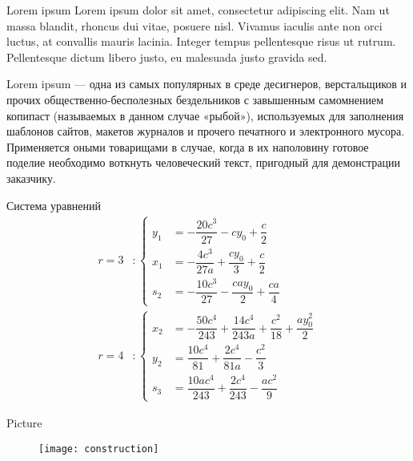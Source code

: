 \documentclass[hyperref={pdftex,unicode}]{beamer}
\begin{document}
\begin{frame}
  \maketitle
\end{frame}

\begin{frame}{Lorem ipsum}
  Lorem ipsum dolor sit amet, consectetur adipiscing elit. Nam ut massa
  blandit, rhoncus dui vitae, posuere nisl. Vivamus iaculis ante non
  orci luctus, at convallis mauris lacinia. Integer tempus pellentesque
  risus ut rutrum. Pellentesque dictum libero justo, eu malesuada justo
  gravida sed. 

  Lorem ipsum — одна из самых популярных в среде десигнеров,
  верстальщиков и прочих общественно-бесполезных бездельников с
  завышенным самомнением копипаст (называемых в данном случае «рыбой»),
  используемых для заполнения шаблонов сайтов, макетов журналов и
  прочего печатного и электронного мусора. Применяется оными товарищами
  в случае, когда в их наполовину готовое поделие необходимо воткнуть
  человеческий текст, пригодный для демонстрации заказчику.
\end{frame}

\begin{frame}{Система уравнений}
  $$
  \begin{aligned}
    r = 3 &:
    \left\{
      \begin{aligned}
        y_1 &= -\dfrac{20c^3}{27} - cy_0 + \dfrac{c}{2} \\
        x_1 &= -\dfrac{4c^3}{27a} + \dfrac{cy_0}{3} + \dfrac{c}{2} \\
        s_2 &= -\dfrac{10c^3}{27} - \dfrac{cay_0}{2} + \dfrac{ca}{4}
      \end{aligned}
    \right.
    \\
    r = 4 &: 
    \left\{
      \begin{aligned}
        x_2 &= -\dfrac{50c^4}{243} + \dfrac{14c^4}{243a} + \dfrac{c^2}{18} + \dfrac{ay^2_0}{2}\\
        y_2 &= \dfrac{10c^4}{81} + \dfrac{2c^4}{81a} - \dfrac{c^2}{3} \\
        s_3 &= \dfrac{10ac^4}{243} + \dfrac{2c^4}{243} - \dfrac{ac^2}{9}
      \end{aligned}
    \right.
  \end{aligned}
  $$
\end{frame}

\begin{frame}{Picture}

\begin{figure}[H]
  \texttt{[image: construction]}
\end{figure}

\end{frame}
\end{document}
